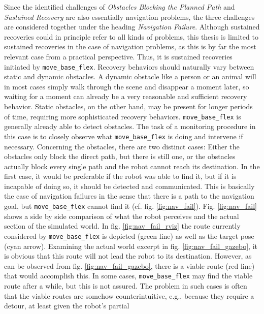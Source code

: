 \documentclass[english, master, utf8]{base/thesis_KBS}
\newcommand{\code}[1]{\colorbox{light-gray}{\texttt{#1}}}
\begin{document}
Since the identified challenges of \textit{Obstacles Blocking the Planned Path} and \textit{Sustained Recovery} are also essentially navigation problems, the three challenges are
considered together under the heading \textit{Navigation Failure}. Although sustained recoveries could in principle refer to all kinds of problems, this thesis is limited to
sustained recoveries in the case of navigation problems, as this is by far the most relevant case from a practical perspective. Thus, it is sustained recoveries initiated by
\code{move\_base\_flex}.\newline
Recovery behaviors should naturally vary between static and dynamic obstacles. A dynamic obstacle like a person or an animal will in most cases simply walk through the scene and
disappear a moment later, so waiting for a moment can already be a very reasonable and sufficient recovery behavior. Static obstacles, on the other hand, may be present for longer
periods of time, requiring more sophisticated recovery behaviors. \code{move\_base\_flex} is generally already able to detect obstacles. The task of a monitoring procedure in this
case is to closely observe what \code{move\_base\_flex} is doing and intervene if necessary. Concerning the obstacles, there are two distinct cases: Either the obstacles only block
the direct path, but there is still one, or the obstacles actually block every single path and the robot cannot reach its destination. In the first case, it would be preferable if
the robot was able to find it, but if it is incapable of doing so, it should be detected and communicated. This is basically the case of navigation failures in the sense that there
is a path to the navigation goal, but \code{move\_base\_flex} cannot find it (cf. fig. \ref{fig:nav_fail}). Fig. \ref{fig:nav_fail} shows a side by side comparison of what the robot
perceives and the actual section of the simulated world. In fig. \ref{fig:nav_fail_rviz} the route currently considered by \code{move\_base\_flex} is depicted (green line) as well as the
target pose (cyan arrow). Examining the actual world excerpt in fig. \ref{fig:nav_fail_gazebo}, it is obvious that this route will not lead the robot to its destination. However, as
can be observed from fig. \ref{fig:nav_fail_gazebo}, there is a viable route (red line) that would accomplish this. In some cases, \code{move\_base\_flex} may find the viable route after a while,
but this is not assured. The problem in such cases is often that the viable routes are somehow counterintuitive, e.g., because they require a detour, at least given the robot's partial
\end{document}
